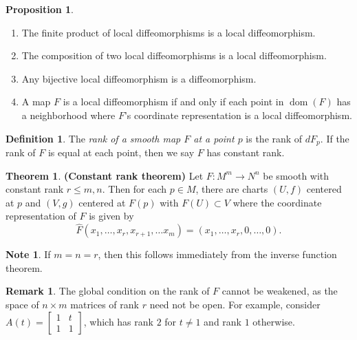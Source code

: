 \documentclass[10pt,letterpaper,cm]{nupset}
\theoremstyle{definition}
\newtheorem*{definition}{Definition}
\newtheorem{remark}{Remark}
\newtheorem{theorem}{Theorem}
\newtheorem*{note}{Note}
\newtheorem{prop}{Proposition}
\newcommand{\1}{\mathbf{1}}
\newcommand{\0}{\vec 0}
\DeclareMathOperator{\dom}{dom}
\begin{document}
\begin{prop} $ $
\begin{enumerate}
\item The finite product of local diffeomorphisms is a local diffeomorphism.
\item The composition of two local diffeomorphisms is a local diffeomorphism.
\item Any bijective local diffeomorphism is a diffeomorphism.
\item A map $F$ is a local diffeomorphism if and only if each point in $\dom(F)$ has a neighborhood where $F$'s coordinate representation is a local diffeomorphism.
\end{enumerate}
\end{prop}

\begin{definition}
The \textit{rank of a smooth map $F$ at a point $p$} is the rank of $dF_p$. If the rank of $F$ is equal at each point, then we say $F$ has constant rank.
\end{definition}

\begin{theorem}{\textbf{(Constant rank theorem)}}
Let $F: M^m \to N^n$ be smooth with constant rank $r\leq m, n$. Then for each $p\in M$, there are charts $(U, f)$ centered at $p$ and $(V, g)$ centered at $F(p)$ with $F(U) \subset V$ where the coordinate representation of $F$ is given by $$\widehat{F}(x_1, \ldots, x_r, x_{r+1}, \ldots x_m) = (x_1, \ldots, x_r, 0,\ldots, 0).$$
\begin{note}
If $m=n =r$, then this follows immediately from the inverse function theorem. 
\end{note}

\begin{remark}
The global condition on the rank of $F$ cannot be weakened, as the space of $n\times m$ matrices of rank $r$ need not be open. For example, consider $A(t) = \begin{bmatrix} 1 & t \\ 1 & 1 \end{bmatrix}$, which has rank $2$ for $t\ne 1$ and rank $1$ otherwise.
\end{remark}
\end{theorem}
\end{document}
